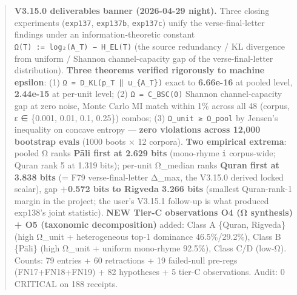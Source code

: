 \documentclass[
]{article}
\begin{document}
\begin{quote}
\textbf{V3.15.0 deliverables banner (2026-04-29 night).} Three closing
experiments (\texttt{exp137}, \texttt{exp137b}, \texttt{exp137c}) unify
the verse-final-letter findings under an information-theoretic constant
\texttt{Ω(T)\ :=\ log₂(A\_T)\ −\ H\_EL(T)} (the source redundancy / KL
divergence from uniform / Shannon channel-capacity gap of the
verse-final-letter distribution). \textbf{Three theorems verified
rigorously to machine epsilon}: (1)
\texttt{Ω\ =\ D\_KL(p\_T\ ‖\ u\_\{A\_T\})} exact to \textbf{6.66e-16} at
pooled level, \textbf{2.44e-15} at per-unit level; (2)
\texttt{Ω\ =\ C\_BSC(0)} Shannon channel-capacity gap at zero noise,
Monte Carlo MI match within 1\% across all 48 (corpus, ε ∈ \{0.001,
0.01, 0.1, 0.25\}) combos; (3) \texttt{Ω\_unit\ ≥\ Ω\_pool} by Jensen's
inequality on concave entropy --- \textbf{zero violations across 12,000
bootstrap evals} (1000 boots × 12 corpora). \textbf{Two empirical
extrema}: pooled Ω ranks \textbf{Pāli first at 2.629 bits} (mono-rhyme
\texttt{i} corpus-wide; Quran rank 5 at 1.319 bits); per-unit Ω\_median
ranks \textbf{Quran first at 3.838 bits} (= F79 verse-final-letter
Δ\_max, the V3.15.0 derived locked scalar), gap \textbf{+0.572 bits to
Rigveda 3.266 bits} (smallest Quran-rank-1 margin in the project; the
user's V3.15.1 follow-up is what produced exp138's joint statistic).
\textbf{NEW Tier-C observations O4 (Ω synthesis) + O5 (taxonomic
decomposition)} added: Class A \{Quran, Rigveda\} (high Ω\_unit +
heterogeneous top-1 dominance 46.5\%/29.2\%), Class B \{Pāli\} (high
Ω\_unit + uniform mono-rhyme 92.5\%), Class C/D (low-Ω). Counts: 79
entries + 60 retractions + 19 failed-null pre-regs (FN17+FN18+FN19) + 82
hypotheses + 5 tier-C observations. Audit: 0 CRITICAL on 188 receipts.
\end{quote}
\end{document}
